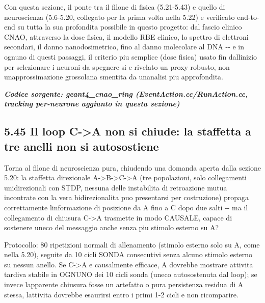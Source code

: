 \documentclass[
  italian,
]{article}
\begin{document}
Con questa sezione, il ponte tra il filone di fisica (5.21-5.43) e quello di neuroscienza (5.6-5.20, collegato per la prima volta nella 5.22) e\textquotesingle{} verificato end-to-end su tutta la sua profondita\textquotesingle{} possibile in questo progetto: dal fascio clinico CNAO, attraverso la dose fisica, il modello RBE clinico, lo spettro di elettroni secondari, il danno nanodosimetrico, fino al danno molecolare al DNA -\/- e in ognuno di questi passaggi, il criterio piu\textquotesingle{} semplice (dose fisica) usato fin dall\textquotesingle inizio per selezionare i neuroni da spegnere si e\textquotesingle{} rivelato un proxy robusto, non un\textquotesingle approssimazione grossolana smentita da un\textquotesingle analisi piu\textquotesingle{} approfondita.

\textit{\textbf{Codice sorgente: geant4\_\allowbreak{}cnao\_\allowbreak{}ring (EventAction.cc/RunAction.cc, tracking per-neurone aggiunto in questa sezione)}}



\subsection{5.45 Il loop C-\textgreater A non si chiude: la staffetta a tre anelli non si autosostiene}\label{il-loop-c-a-non-si-chiude-la-staffetta-a-tre-anelli-non-si-autosostiene}

Torna al filone di neuroscienza pura, chiudendo una domanda aperta dalla sezione 5.20: la staffetta direzionale A-\textgreater B-\textgreater C-\textgreater A (tre popolazioni, solo collegamenti unidirezionali con STDP, nessuna delle instabilita\textquotesingle{} di retroazione mutua incontrate con la vera bidirezionalita\textquotesingle{} puo\textquotesingle{} presentarsi per costruzione) propaga correttamente l\textquotesingle informazione di posizione da A fino a C dopo due salti -\/- ma il collegamento di chiusura C-\textgreater A trasmette in modo CAUSALE, capace di sostenere un\textquotesingle eco del messaggio anche senza piu\textquotesingle{} stimolo esterno su A?

Protocollo: 80 ripetizioni normali di allenamento (stimolo esterno solo su A, come nella 5.20), seguite da 10 cicli SONDA consecutivi senza alcuno stimolo esterno su nessun anello. Se C-\textgreater A e\textquotesingle{} causalmente efficace, A dovrebbe mostrare attivita\textquotesingle{} tardiva stabile in OGNUNO dei 10 cicli sonda (un\textquotesingle eco autosostenuta dal loop); se invece l\textquotesingle apparente chiusura fosse un artefatto o pura persistenza residua di A stessa, l\textquotesingle attivita\textquotesingle{} dovrebbe esaurirsi entro i primi 1-2 cicli e non ricomparire.
\end{document}
